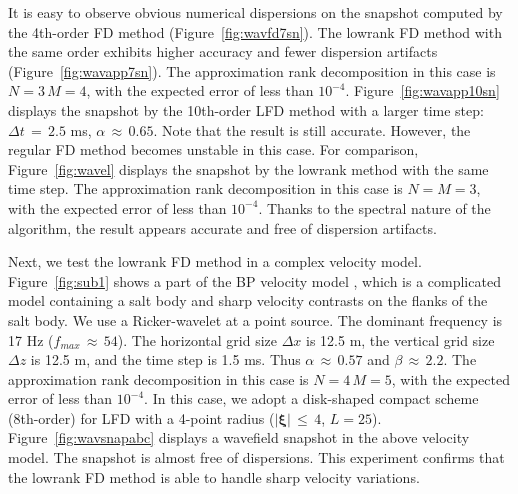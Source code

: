 {

It is easy to observe obvious numerical dispersions on the snapshot computed by the 4th-order FD method (Figure~\ref{fig:wavfd7sn}). 
The lowrank FD method with the same order exhibits higher accuracy and fewer dispersion artifacts (Figure~\ref{fig:wavapp7sn}). 
The approximation
rank decomposition in this case is $N=3\, M=4$, with the expected error of
less than $10^{-4}$.
Figure~\ref{fig:wavapp10sn} displays the snapshot by the 10th-order LFD method with a larger time step: $\Delta t\,=\,2.5$ ms, $\alpha\,\approx\,0.65$. Note that the result is still accurate. However, the regular FD method becomes unstable in this case.   
For comparison, Figure~\ref{fig:wavel} displays the snapshot by the lowrank method with the same time step. 
The approximation
rank decomposition in this case is $N=M=3$, with the expected error of
less than $10^{-4}$.
Thanks to the spectral nature of the algorithm, the result appears accurate and free of dispersion artifacts.   


Next, we test the lowrank FD method in a complex velocity model.
Figure~\ref{fig:sub1} shows a part of the BP velocity model \cite[]{bp}, which is a complicated model containing a salt body and sharp velocity contrasts on the flanks of the salt body. 
We use a Ricker-wavelet at a point source. The dominant frequency is 17 Hz ($f_{max}\,\approx\,54$). 
The horizontal grid size $\Delta x$ is 12.5 m, the vertical grid size $\Delta z$ is 12.5 m, and the time step is 1.5 ms.
Thus $\alpha\,\approx\,0.57$ and $\beta\,\approx\,2.2$. 
The approximation
rank decomposition in this case is $N=4\, M=5$, with the expected error of
less than $10^{-4}$.
In this case, we adopt a disk-shaped compact scheme (8th-order) for LFD with a 4-point radius ($|\mathbf{\xi}|\,\le\,4$, $L=25$). 
Figure~\ref{fig:wavsnapabc} displays a wavefield snapshot in the above velocity model.
The snapshot is almost free of dispersions. 
This experiment confirms that the lowrank FD method is able to handle sharp velocity variations.

}
